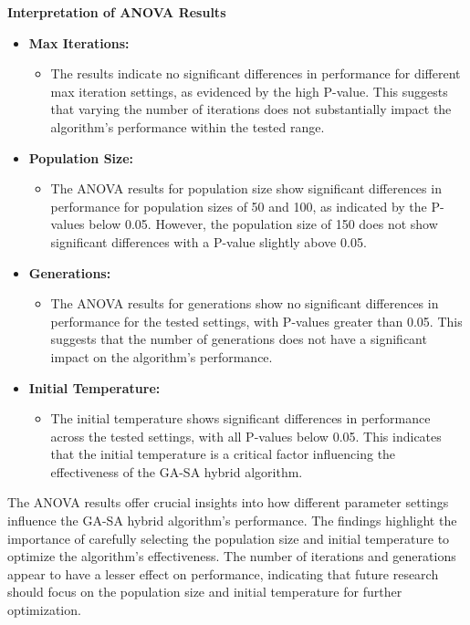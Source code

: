 \documentclass{article}
\begin{document}
    \textbf{Interpretation of ANOVA Results}

    \begin{itemize}
        \item \textbf{Max Iterations:}
        \begin{itemize}
            \item The results indicate no significant differences in performance for different max iteration settings, as evidenced by the high P-value. This suggests that varying the number of iterations does not substantially impact the algorithm's performance within the tested range.
        \end{itemize}
        \item \textbf{Population Size:}
        \begin{itemize}
            \item The ANOVA results for population size show significant differences in performance for population sizes of 50 and 100, as indicated by the P-values below 0.05. However, the population size of 150 does not show significant differences with a P-value slightly above 0.05.
        \end{itemize}
        \item \textbf{Generations:}
        \begin{itemize}
            \item The ANOVA results for generations show no significant differences in performance for the tested settings, with P-values greater than 0.05. This suggests that the number of generations does not have a significant impact on the algorithm's performance.
        \end{itemize}
        \item \textbf{Initial Temperature:}
        \begin{itemize}
            \item The initial temperature shows significant differences in performance across the tested settings, with all P-values below 0.05. This indicates that the initial temperature is a critical factor influencing the effectiveness of the GA-SA hybrid algorithm.
        \end{itemize}
    \end{itemize}

    The ANOVA results offer crucial insights into how different parameter settings influence the GA-SA hybrid algorithm's performance. The findings highlight the importance of carefully selecting the population size and initial temperature to optimize the algorithm's effectiveness. The number of iterations and generations appear to have a lesser effect on performance, indicating that future research should focus on the population size and initial temperature for further optimization.
\end{document}
